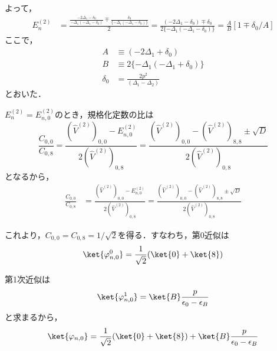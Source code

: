 よって，
\begin{align}
    E^{(2)}_n&=\frac{
    \frac{-2\Delta_1 - \delta_0}{-\Delta_1(-\Delta_1 - \delta_0)}
    \mp 
    \frac{\delta_0}
    {\{-\Delta_1(-\Delta_1 - \delta_0)\}}
    }{2}
    =\frac{
    (-2\Delta_1 - \delta_0)
    \mp \delta_0
    }{2\{-\Delta_1(-\Delta_1 - \delta_0)\}}
    =\frac{A}{B}[1\mp\delta_0/A]
\end{align}
ここで，
\begin{align}
    A&\equiv (-2\Delta_1 + \delta_0)\\[10pt]
    B&\equiv 2\{-\Delta_1(-\Delta_1 + \delta_0)\}\\[10pt]
    \delta_0 &= \frac{2p^2}{(\Delta_{1}-\Delta_{2})}
\end{align}
とおいた．

$E_n^{(2)}=E_{n,0}^{(2)}$のとき，規格化定数の比は
\begin{equation}
    \frac{C_{0,0}}{C_{0,8}} 
    = \frac{(\hat{V}^{(2)})_{0,0} - E_{n,0}^{(2)}}{2(\hat{V}^{(2)})_{0,8} }
    =  \frac{(\hat{V}^{(2)})_{0,0} - (\hat{V}^{(2)})_{8,8} \pm \sqrt{D}}
    {2(\hat{V}^{(2)})_{0,8} }
\end{equation}
となるから，
\begin{align}
    \frac{C_{0,0}}{C_{0,8}} 
    &= \frac{(\hat{V}^{(2)})_{0,0} - E_{n,0}^{(2)}}{2(\hat{V}^{(2)})_{0,8}}
    =  \frac{(\hat{V}^{(2)})_{0,0} - (\hat{V}^{(2)})_{8,8} \pm \sqrt{D}}
    {2(\hat{V}^{(2)})_{0,8} }
\end{align}


これより，$C_{0,0}=C_{0,8}=1/\sqrt{2}$を得る．すなわち，第0近似は
\begin{equation}
    \ket{\varphi_{n,0}^{0}} = \frac{1}{\sqrt{2}}(\ket{0}+\ket{8})
\end{equation}

第1次近似は
\begin{equation}
    \ket{\varphi_{n,0}^{1}} = \ket{B}\frac{p}{\epsilon_0-\epsilon_{B}}
\end{equation}
と求まるから，
\begin{equation}
     \ket{\varphi_{n,0}} 
     = \frac{1}{\sqrt{2}}(\ket{0}+\ket{8}) + \ket{B}\frac{p}{\epsilon_0-\epsilon_{B}}
\end{equation}







